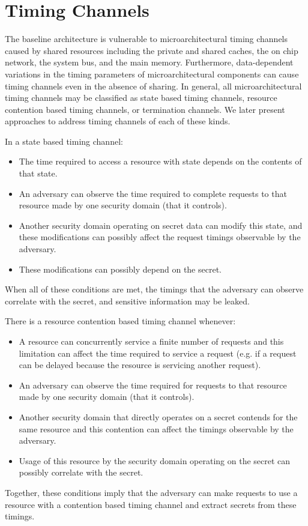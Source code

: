 \section{Timing Channels}
\label{sec:tc_sources}
The baseline architecture is vulnerable to microarchitectural timing channels 
caused by shared resources including the private and shared caches, the on chip 
network, the system bus, and the main memory. Furthermore, data-dependent 
variations in the timing parameters of microarchitectural components can cause 
timing channels even in the absence of sharing. In general, all 
microarchitectural timing channels may be classified as state based timing 
channels, resource contention based timing channels, or termination channels.  
We later present approaches to address timing channels of each of these kinds.

In a state based timing channel:
\begin{itemize}
    \item The time required to access a resource with state depends on the 
        contents of that state.
    \item An adversary can observe the time required to complete requests to 
        that resource made by one security domain (that it controls).
    \item Another security domain operating on secret data can modify this 
        state, and these modifications can possibly affect the request timings 
        observable by the adversary.
    \item These modifications can possibly depend on the secret.
\end{itemize}
When all of these conditions are met, the timings that the adversary can 
observe correlate with the secret, and sensitive information may be leaked.

There is a resource contention based timing channel whenever:
\begin{itemize}
    \item A resource can concurrently service a finite number of requests and 
        this limitation can affect the time required to service a request (e.g.  
        if a request can be delayed because the resource is servicing another 
        request).
    \item An adversary can observe the time required for requests to that 
        resource made by one security domain (that it controls).
    \item Another security domain that directly operates on a secret contends 
        for the same resource and this contention can affect the timings 
        observable by the adversary.
    \item Usage of this resource by the security domain operating on the secret 
        can possibly correlate with the secret.
\end{itemize}
Together, these conditions imply that the adversary can make requests to use a 
resource with a contention based timing channel and extract secrets from these 
timings.

